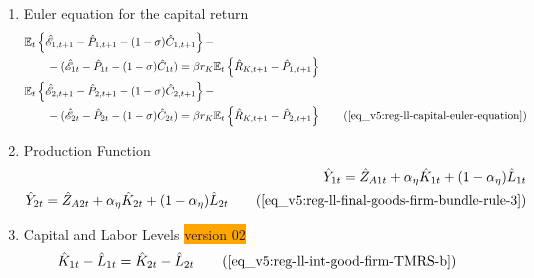 \documentclass[../thesis.tex]{subfiles}
\begin{document}
{\begin{enumerate}
		\item Euler equation for the capital return
		\begin{alignat}{2}
			&\E \left\{ \hat{\mathscr{E}}_{1, t+1} - \hat{P}_{1, t+1}  - (1 -\sigma) \hat{C}_{1, t+1} \right\} - \nonumber \\ &\qquad - (\hat{\mathscr{E}}_{1 t} - \hat{P}_{1 t} - (1 -\sigma) \hat{C}_{1 t}) = \beta r_{K} \mathbb{E}_t \left\{ \hat{R}_{K, t+1} - \hat{P}_{1, t+1} \right\} \nonumber \\
			&\E \left\{ \hat{\mathscr{E}}_{2, t+1} - \hat{P}_{2, t+1}  - (1 -\sigma) \hat{C}_{2, t+1} \right\} - \nonumber \\ &\qquad - (\hat{\mathscr{E}}_{2 t} - \hat{P}_{2 t} - (1 -\sigma) \hat{C}_{2 t}) = \beta r_{K} \mathbb{E}_t \left\{ \hat{R}_{K, t+1} - \hat{P}_{2, t+1} \right\} \tag{\ref{eq_v5:reg-ll-capital-euler-equation}}
		\end{alignat}
		
		\item Production Function
		\begin{align}
			\hat{Y}_{1 t} = \hat{Z}_{A1 t} + {\alpha_{\eta}} \hat{K}_{1 t} + (1-\alpha_{\eta}) \hat{L}_{1 t} \nonumber \\
			\hat{Y}_{2 t} = \hat{Z}_{A2 t} + {\alpha_{\eta}} \hat{K}_{2 t} + (1-\alpha_{\eta}) \hat{L}_{2 t} \tag{\ref{eq_v5:reg-ll-final-goods-firm-bundle-rule-3}}
		\end{align}

		\item Capital and Labor Levels \colorbox{orange}{version 02}
		\begin{align}
			\hat{K}_{1t} - \hat{L}_{1t} &= \hat{K}_{2t} - \hat{L}_{2t} \tag{\ref{eq_v5:reg-ll-int-good-firm-TMRS-b}}
		\end{align}


\begin{comment}
	
		\item Marginal Rates of Substitution of Factors
\begin{align}
	\hat{K}_{1 t} - \hat{L}_{1 t} = \hat{W}_{t} - \hat{R}_{K t} \nonumber \\
	\hat{K}_{2 t} - \hat{L}_{2 t} = \hat{W}_{t} - \hat{R}_{K t} \tag{\ref{eq_v5:reg-ll-int-good-firm-TMRS}}
\end{align}	
	
\end{comment}
		

\end{enumerate}}
\end{document}
